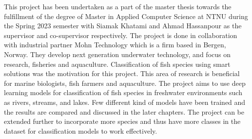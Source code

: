 
This project has been undertaken as a part of the master thesis towards the fulfillment of the degree of Master in Applied Computer Science at NTNU during the Spring 2023 semester with Siamak Khatami and Ahmad Hassanpour as the supervisor and co-supervisor respectively. The project is done in collaboration with industrial partner Mohn Technology which is a firm based in Bergen, Norway. They develop next generation underwater technology, and focus on research, fisheries and aquaculture. Classification of fish species using smart solutions was the motivation for this project. This area of research is beneficial for marine biologists, fish farmers and aquaculture. The project aims to use deep learning models for classification of fish species in freshwater environments such as rivers, streams, and lakes. Few different kind of models have been trained and the results are compared and discussed in the later chapters. The project can be extended further to incorporate more species and thus have more classes in the dataset for classification models to work effectively.    \\






